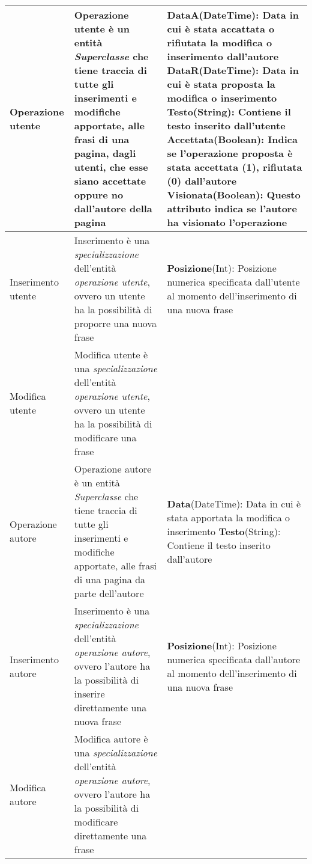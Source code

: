 \begin{longtable}{|p{2.5cm}|p{6cm}|L|}
\hline
Operazione utente& 
Operazione utente è un entità \textit{Superclasse} che tiene traccia di tutte gli inserimenti e modifiche apportate, alle frasi di una pagina, dagli utenti, che esse siano accettate oppure no dall'autore della pagina &
\textbf{DataA}(DateTime): Data in cui è stata accattata o rifiutata la modifica o inserimento dall'autore \newline
\textbf{DataR}(DateTime): Data in cui è stata proposta la modifica o inserimento \newline
\textbf{Testo}(String): Contiene il testo inserito dall'utente \newline
\textbf{Accettata}(Boolean): Indica se l'operazione proposta è stata accettata (1), rifiutata (0) dall'autore \newline
\textbf{Visionata}(Boolean): Questo attributo indica se l'autore ha visionato l'operazione\\

\hline
Inserimento utente & 
Inserimento è una \textit{specializzazione} dell'entità \textit{operazione utente}, ovvero un utente ha la possibilità di proporre una nuova frase & 
\textbf{Posizione}(Int): Posizione numerica specificata dall'utente al momento dell'inserimento di una nuova frase\\

\hline
Modifica utente & 
Modifica utente è una \textit{specializzazione} dell'entità \textit{operazione utente}, ovvero un utente ha la possibilità di modificare una frase & \\

\hline
Operazione autore & 
Operazione autore è un entità \textit{Superclasse} che tiene traccia di tutte gli inserimenti e modifiche apportate, alle frasi di una pagina da parte dell'autore &
\textbf{Data}(DateTime): Data in cui è stata apportata la modifica o inserimento \newline
\textbf{Testo}(String): Contiene il testo inserito dall'autore\\

\hline
Inserimento autore & 
Inserimento è una \textit{specializzazione} dell'entità \textit{operazione autore}, ovvero l'autore ha la possibilità di inserire direttamente una nuova frase & 
\textbf{Posizione}(Int): Posizione numerica specificata dall'autore al momento dell'inserimento di una nuova frase\\

\hline
Modifica autore & 
Modifica autore è una \textit{specializzazione} dell'entità \textit{operazione autore}, ovvero l'autore ha la possibilità di modificare direttamente una frase & \\

\hline
\end{longtable}


